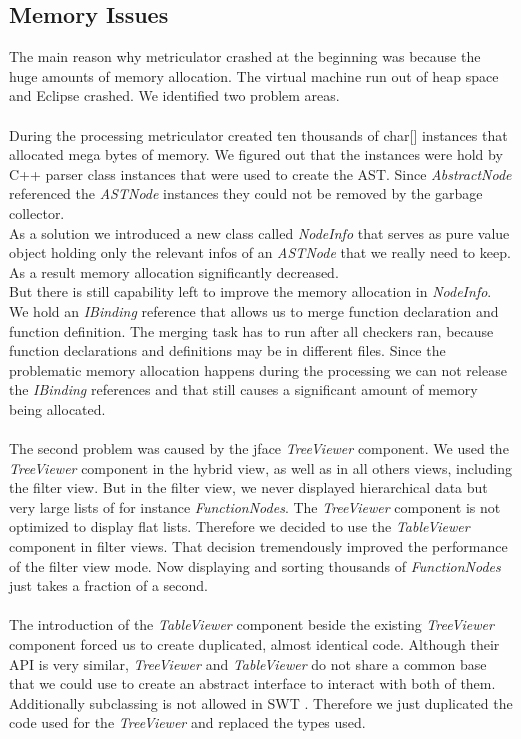 \documentclass[11pt,a4paper,oneside]{scrreprt}
\begin{document}
\subsection{Memory Issues}
The main reason why metriculator crashed at the beginning was because the huge amounts of memory allocation. The virtual machine run out of heap space and Eclipse crashed. We identified two problem areas.
\\\\
During the processing metriculator created ten thousands of char[] instances that allocated mega bytes of memory. We figured out that the instances were hold by C++ parser class instances that were used to create the AST. Since \textit{AbstractNode} referenced the \textit{ASTNode} instances they could not be removed by the garbage collector.\\
As a solution we introduced a new class called \textit{NodeInfo} that serves as pure value object holding only the relevant infos of an \textit{ASTNode} that we really need to keep. As a result memory allocation significantly decreased.\\
But there is still capability left to improve the memory allocation in \textit{NodeInfo}. We hold an \textit{IBinding} reference that allows us to merge function declaration and function definition. The merging task has to run after all checkers ran, because function declarations and definitions may be in different files. Since the problematic memory allocation happens during the processing we can not release the \textit{IBinding} references and that still causes a significant amount of memory being allocated.
\\\\
The second problem was caused by the jface \textit{TreeViewer} component. We used the \textit{TreeViewer} component in the hybrid view, as well as in all others views, including the filter view. But in the filter view, we never displayed hierarchical data but very large lists of for instance \textit{FunctionNodes}. The \textit{TreeViewer} component is not optimized to display flat lists. Therefore we decided to use the \textit{TableViewer} component in filter views. That decision tremendously improved the performance of the filter view mode. Now displaying and sorting thousands of \textit{FunctionNodes} just takes a fraction of a second. 
\\\\
The introduction of the \textit{TableViewer} component beside the existing \textit{TreeViewer} component forced us to create duplicated, almost identical code. Although their API is very similar, \textit{TreeViewer} and \textit{TableViewer} do not share a common base that we could use to create an abstract interface to interact with both of them. Additionally subclassing is not allowed in SWT \cite{swtsubclassing}. Therefore we just duplicated the code used for the \textit{TreeViewer} and replaced the types used.
\end{document}
